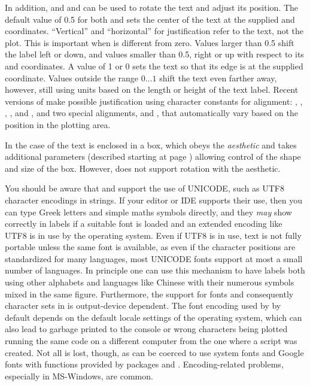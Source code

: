 \documentclass[krantz2]{krantz}\usepackage{knitr}
\begin{document}
In addition,  and  and  can be used to rotate the text and adjust its position. The default value of 0.5 for both  and  sets the center of the text at the supplied  and  coordinates. ``Vertical'' and ``horizontal'' for justification refer to the text, not the plot. This is important when  is different from zero. Values larger than 0.5 shift the label left or down, and values smaller than 0.5, right or up with respect to its  and  coordinates. A value of 1 or 0 sets the text so that its edge is at the supplied coordinate. Values outside the range $0\ldots 1$ shift the text even farther away, however, still using units based on the length or height of the text label. Recent versions of  make possible justification using character constants for alignment: , , , ,  and , and two special alignments,  and , that automatically vary based on the position in the plotting area.

In the case of  the text is enclosed in a box, which obeys the  \emph{aesthetic} and takes additional parameters (described starting at page \pageref{start:plot:label}) allowing control of the shape and size of the box. However,  does not support rotation with the  aesthetic.

\begin{warningbox}
You should be aware that \Rlang and \ggplot support the use of UNICODE, such as UTF8 character encodings in strings. If your editor or IDE supports their use, then you can type Greek letters and simple maths symbols directly, and they \emph{may} show correctly in labels if a suitable font is loaded and an extended encoding like UTF8 is in use by the operating system. Even if UTF8 is in use, text is not fully portable unless the same font is available, as even if the character positions are standardized for many languages, most UNICODE fonts support at most a small number of languages. In principle one can use this mechanism to have labels both using other alphabets and languages like Chinese with their numerous symbols mixed in the same figure. Furthermore, the support for fonts and consequently character sets in \Rlang is output-device dependent. The font encoding used by \Rlang by default depends on the default locale settings of the operating system, which can also lead to garbage printed to the console or wrong characters being plotted running the same code on a different computer from the one where a script was created. Not all is lost, though, as \Rlang can be coerced to use system fonts and Google fonts with functions provided by packages  and . Encoding-related problems, especially in MS-Windows, are common.
\end{warningbox}
\end{document}

